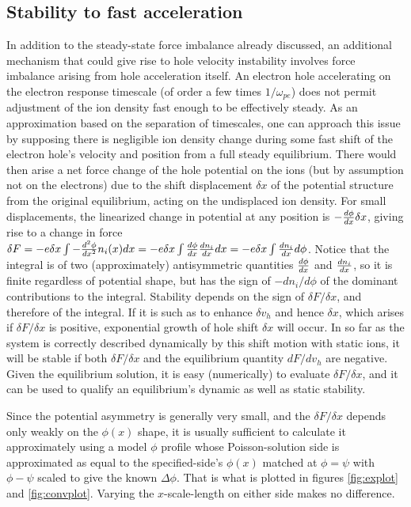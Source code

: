 \documentclass[pre]{revtex4-2}
\begin{document}
\subsection{Stability to fast acceleration}

In addition to the steady-state force imbalance already discussed, an
additional mechanism that could give rise to hole velocity instability
involves force imbalance arising from hole acceleration itself. An
electron hole accelerating on the electron response timescale (of
order a few times $1/\omega_{pe}$) does not
permit adjustment of the ion density fast enough to be effectively
steady. As an approximation based on the separation of timescales, one
can approach this issue by supposing there is negligible ion density
change during some fast shift of the electron hole's velocity and
position from a full steady equilibrium. There would then arise a net
force change of the hole potential on the ions (but by assumption not
on the electrons) due to the shift displacement $\delta x$ of the
potential structure from the original equilibrium, acting on the
undisplaced ion density. For small displacements, the linearized
change in potential at any position is $-{d\phi\over dx} \delta x$,
giving rise to a change in force
$\delta F = - e\delta x \int -{d^2\phi\over dx^2} n_i(x) dx = -e\delta
x \int{d\phi\over dx} {dn_i\over dx} dx=-e\delta x \int {dn_i\over dx}
d\phi$. Notice that the integral is of two (approximately)
antisymmetric quantities ${d\phi\over dx}$ and ${dn_i\over dx}$, so it
is finite regardless of potential shape, but has the sign of
$-dn_i/d\phi$ of the dominant contributions to the integral. Stability
depends on the sign of $\delta F/\delta x$, and therefore of the
integral. If it is such as to enhance $\delta v_h$ and hence
$\delta x$, which arises if $\delta F/\delta x$ is positive,
exponential growth of hole shift $\delta x$ will occur. In so far as the system is correctly
described dynamically by this shift motion with static ions, it will
be stable if both $\delta F/\delta x$ and the equilibrium quantity
$dF/dv_h$ are negative. Given the equilibrium solution, it is easy
(numerically) to evaluate $\delta F/\delta x$, and it can be used to
qualify an equilibrium's dynamic as well as static stability. 

Since the potential asymmetry is generally very small, and the
$\delta F/\delta x$ depends only weakly on the $\phi(x)$ shape, it is
usually sufficient to calculate it approximately using a model $\phi$
profile whose Poisson-solution side is approximated as equal to the
specified-side's $\phi(x)$ matched at $\phi=\psi$ with
$\phi-\psi$ scaled to give the known $\Delta\phi$. That is what is
plotted in figures \ref{fig:explot} and \ref{fig:convplot}. Varying
the $x$-scale-length on either side makes no difference.
\end{document}
